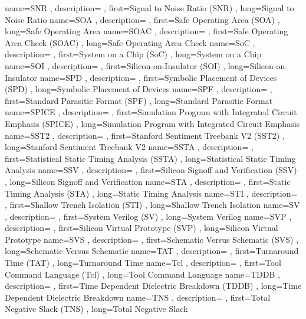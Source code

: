 { name={SNR}
, description={}
, first={Signal to Noise Ratio (SNR)}
, long={Signal to Noise Ratio}
}
{ name={SOA}
, description={}
, first={Safe Operating Area (SOA)}
, long={Safe Operating Area}
}
{ name={SOAC}
, description={}
, first={Safe Operating Area Check (SOAC)}
, long={Safe Operating Area Check}
}
{ name={SoC}
, description={}
, first={System on a Chip (SoC)}
, long={System on a Chip}
}
{ name={SOI}
, description={}
, first={Silicon-on-Insulator (SOI)}
, long={Silicon-on-Insulator}
}
{ name={SPD}
, description={}
, first={Symbolic Placement of Devices (SPD)}
, long={Symbolic Placement of Devices}
}
{ name={SPF}
, description={}
, first={Standard Parasitic Format (SPF)}
, long={Standard Parasitic Format}
}
{ name={SPICE}
, description={}
, first={Simulation Program with Integrated Circuit Emphasis (SPICE)}
, long={Simulation Program with Integrated Circuit Emphasis}
}
{ name={SST2}
, description={}
, first={Stanford Sentiment Treebank V2 (SST2)}
, long={Stanford Sentiment Treebank V2}
}
{ name={SSTA}
, description={}
, first={Statistical Static Timing Analysis (SSTA)}
, long={Statistical Static Timing Analysis}
}
{ name={SSV}
, description={}
, first={Silicon Signoff and Verification (SSV)}
, long={Silicon Signoff and Verification}
}
{ name={STA}
, description={}
, first={Static Timing Analysis (STA)}
, long={Static Timing Analysis}
}
{ name={STI}
, description={}
, first={Shallow Trench Isolation (STI)}
, long={Shallow Trench Isolation}
}
{ name={SV}
, description={}
, first={System Verilog (SV)}
, long={System Verilog}
}
{ name={SVP}
, description={}
, first={Silicon Virtual Prototype (SVP)}
, long={Silicon Virtual Prototype}
}
{ name={SVS}
, description={}
, first={Schematic Versus Schematic (SVS)}
, long={Schematic Versus Schematic}
}
{ name={TAT}
, description={}
, first={Turnaround Time (TAT)}
, long={Turnaround Time}
}
{ name={Tcl}
, description={}
, first={Tool Command Language (Tcl)}
, long={Tool Command Language}
}
{ name={TDDB}
, description={}
, first={Time Dependent Dielectric Breakdown (TDDB)}
, long={Time Dependent Dielectric Breakdown}
}
{ name={TNS}
, description={}
, first={Total Negative Slack (TNS)}
, long={Total Negative Slack}
}
